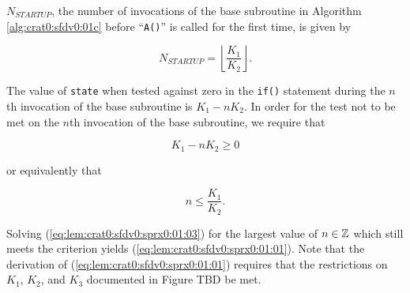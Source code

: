 \begin{vworklemmastatement}
\label{lem:crat0:sfdv0:sprx0:01}
$N_{STARTUP}$, the number of invocations of the base subroutine
in Algorithm \ref{alg:crat0:sfdv0:01c} before ``\texttt{A()}'' is called
for the first time, is given by

\begin{equation}
\label{eq:lem:crat0:sfdv0:sprx0:01:01}
N_{STARTUP} = 
\left\lfloor
{
\frac{K_1}{K_2}
}
\right\rfloor .
\end{equation} 
\end{vworklemmastatement}
\begin{vworklemmaproof}
The value of \texttt{state} when tested against
zero in the \texttt{if()} statement during the $n$th invocation
of the base subroutine is $K_1 - n K_2$.  In order for the test
not to be met on the $n$th invocation
of the base subroutine, we require that

\begin{equation}
\label{eq:lem:crat0:sfdv0:sprx0:01:02}
K_1 - n K_2 \geq 0
\end{equation} 

\noindent{}or equivalently that

\begin{equation}
\label{eq:lem:crat0:sfdv0:sprx0:01:03}
n \leq \frac{K_1}{K_2} .
\end{equation} 

Solving (\ref{eq:lem:crat0:sfdv0:sprx0:01:03}) for the 
largest value of $n \in {\mathbb{Z}}$ which still meets the criterion
yields (\ref{eq:lem:crat0:sfdv0:sprx0:01:01}).  Note that 
the derivation of (\ref{eq:lem:crat0:sfdv0:sprx0:01:01}) requires
that the restrictions on $K_1$, $K_2$, and $K_3$ documented in
Figure TBD
be met.
\end{vworklemmaproof}

